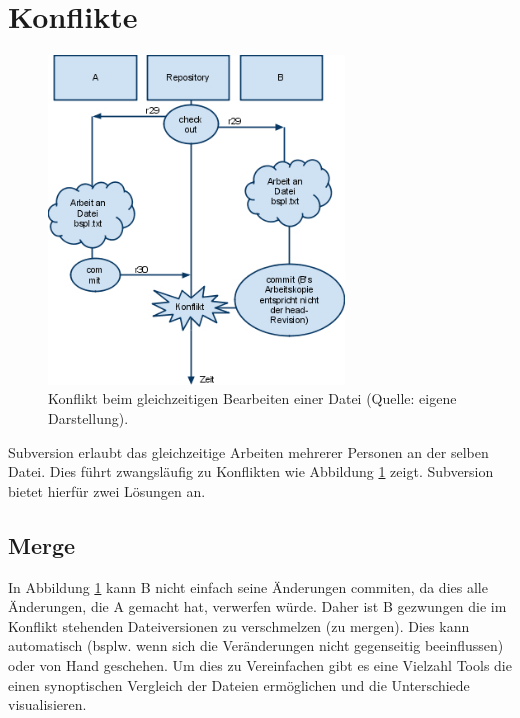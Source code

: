 \section{Konflikte}
\begin{figure}[!htb]
\centering
\includegraphics[width=0.7\textwidth]{konflikt}
\caption{Konflikt beim gleichzeitigen Bearbeiten einer Datei (Quelle: eigene Darstellung).}
\label{fig:konflikt}
\end{figure}
Subversion erlaubt das gleichzeitige Arbeiten mehrerer Personen an der selben Datei. Dies führt zwangsläufig zu Konflikten wie Abbildung \ref{fig:konflikt} zeigt. Subversion bietet hierfür zwei Lösungen an.
\subsection{Merge}
In Abbildung \ref{fig:konflikt} kann B nicht einfach seine Änderungen commiten, da dies alle Änderungen, die A gemacht hat, verwerfen würde. Daher ist B gezwungen die im Konflikt stehenden Dateiversionen zu verschmelzen (zu mergen). Dies kann automatisch (bsplw. wenn sich die Veränderungen nicht gegenseitig beeinflussen) oder von Hand geschehen. Um dies zu Vereinfachen gibt es eine Vielzahl Tools die einen synoptischen Vergleich der Dateien ermöglichen und die Unterschiede visualisieren.

